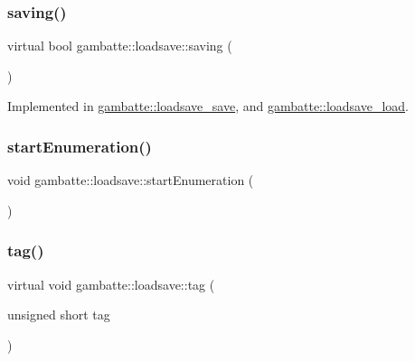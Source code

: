 \subsubsection{\texorpdfstring{saving()}{saving()}}
{\footnotesize\ttfamily virtual bool gambatte\+::loadsave\+::saving (\begin{DoxyParamCaption}{ }\end{DoxyParamCaption})\hspace{0.3cm}{\ttfamily [pure virtual]}}



Implemented in \hyperlink{classgambatte_1_1loadsave__save_a61ddca93672c2924df92e9f5652dd849}{gambatte\+::loadsave\+\_\+save}, and \hyperlink{classgambatte_1_1loadsave__load_a2ac8e306cef4eab6a804deab9e853fd3}{gambatte\+::loadsave\+\_\+load}.

\mbox{\label{classgambatte_1_1loadsave_acbec8a5cd9098a7a796a863149ed8e22}} 
\subsubsection{\texorpdfstring{start\+Enumeration()}{startEnumeration()}}
{\footnotesize\ttfamily void gambatte\+::loadsave\+::start\+Enumeration (\begin{DoxyParamCaption}{ }\end{DoxyParamCaption})\hspace{0.3cm}{\ttfamily [inline]}}

\mbox{\label{classgambatte_1_1loadsave_af4a635fc49c23e53e48b2b9d320aa165}} 
\subsubsection{\texorpdfstring{tag()}{tag()}}
{\footnotesize\ttfamily virtual void gambatte\+::loadsave\+::tag (\begin{DoxyParamCaption}\item[{unsigned short}]{tag }\end{DoxyParamCaption})\hspace{0.3cm}{\ttfamily [pure virtual]}}



